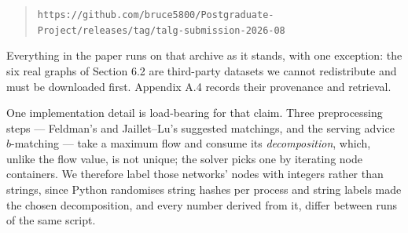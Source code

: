 \begin{quote}
\texttt{https://github.com/bruce5800/Postgraduate-Project/releases/tag/talg-submission-2026-08}
\end{quote}

Everything in the paper runs on that archive as it stands, with one
exception: the six real graphs of Section 6.2 are third-party datasets
we cannot redistribute and must be downloaded first. Appendix A.4
records their provenance and retrieval.

One implementation detail is load-bearing for that claim. Three
preprocessing steps --- Feldman's and Jaillet--Lu's suggested matchings,
and the serving advice \(b\)-matching --- take a maximum flow and
consume its \emph{decomposition}, which, unlike the flow value, is not
unique; the solver picks one by iterating node containers. We therefore
label those networks' nodes with integers rather than strings, since
Python randomises string hashes per process and string labels made the
chosen decomposition, and every number derived from it, differ between
runs of the same script.

